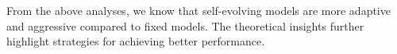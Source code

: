 From the above analyses, we know that self-evolving models are more adaptive and aggressive compared to fixed models. The theoretical insights further highlight strategies for achieving better performance.








    









